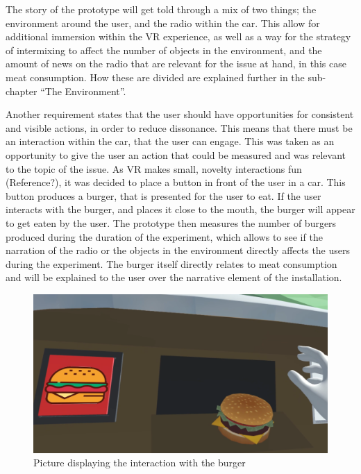         
 The story of the prototype will get told through a mix of two things; the environment around the user, and the radio within the car. This allow for additional immersion within the VR experience, as well as a way for the strategy of intermixing to affect the number of objects in the environment, and the amount of news on the radio that are relevant for the issue at hand, in this case meat consumption. How these are divided are explained further in the sub-chapter “The Environment”.

Another requirement states that the user should have opportunities for consistent and visible actions, in order to reduce dissonance. This means that there must be an interaction within the car, that the user can engage. This was taken as an opportunity to give the user an action that could be measured and was relevant to the topic of the issue. As VR makes small, novelty interactions fun (Reference?), it was decided to place a button in front of the user in a car. This button produces a burger, that is presented for the user to eat. If the user interacts with the burger, and places it close to the mouth, the burger will appear to get eaten by the user. The prototype then measures the number of burgers produced during the duration of the experiment, which allows to see if the narration of the radio or the objects in the environment directly affects the users during the experiment. The burger itself directly relates to meat consumption and will be explained to the user over the narrative element of the installation. 

 \begin{figure}[H]
        	\centering
        	\includegraphics[width=0.9\linewidth]{figure/Design/Designpic2.png}
        	\caption{Picture displaying the interaction with the burger}
        	\label{fig:designpic2}
        \end{figure}


